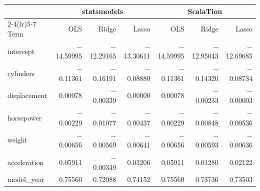 \begin{tabular}{@{}lrrrrrr@{}}
\toprule
 & \multicolumn{3}{c}{statsmodels} & \multicolumn{3}{c}{ScalaTion} \\
\cmidrule(lr){2-4}\cmidrule(lr){5-7}
Term & OLS & Ridge & Lasso & OLS & Ridge & Lasso \\
\midrule
intercept & $-$14.59995 & $-$12.29165 & $-$13.30611 & $-$14.59995 & $-$12.95043 & $-$12.69685 \\
cylinders & $-$0.11361 & $-$0.16191 & $-$0.08880 & $-$0.11361 & $-$0.14320 & $-$0.08734 \\
displacement & 0.00078 & $-$0.00339 & 0.00000 & 0.00078 & $-$0.00233 & $-$0.00003 \\
horsepower & $-$0.00229 & $-$0.01077 & $-$0.00437 & $-$0.00229 & $-$0.00848 & $-$0.00536 \\
weight & $-$0.00656 & $-$0.00569 & $-$0.00641 & $-$0.00656 & $-$0.00593 & $-$0.00636 \\
acceleration & 0.05911 & $-$0.00349 & 0.03206 & 0.05911 & 0.01280 & 0.02122 \\
model\_year & 0.75560 & 0.72988 & 0.74152 & 0.75560 & 0.73736 & 0.73503 \\
\bottomrule
\end{tabular}